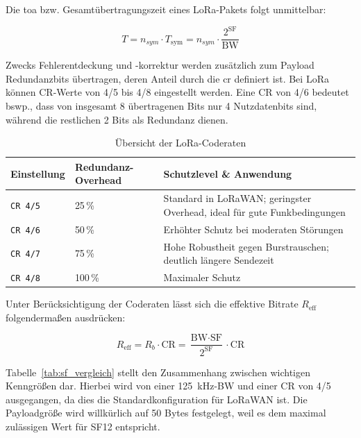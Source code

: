 Die \acrfull{toa} bzw. Gesamtübertragungszeit eines LoRa-Pakets folgt unmittelbar:

\begin{equation}
  T = n_{sym} \cdot T_\text{sym} = n_{sym} \cdot \frac{2^\text{SF}}{\text{BW}}
  \label{eq:ToA}
\end{equation}

Zwecks Fehlerentdeckung und -korrektur werden zusätzlich zum Payload Redundanzbits übertragen, deren Anteil durch die 
\acrfull{cr} definiert ist. Bei LoRa können CR-Werte von 4/5 bis 4/8 eingestellt werden. Eine CR von 4/6 bedeutet bswp., dass
von insgesamt 8 übertragenen Bits nur 4 Nutzdatenbits sind, während die restlichen 2 Bits als Redundanz dienen. 

\begin{table}[htbp]
    \centering
    \caption{Übersicht der LoRa-Coderaten}
    \label{tab:lora_CR}
    \begin{tabularx}{\textwidth}{l X X}
        \toprule
        \textbf{Einstellung} & \textbf{Redundanz-Overhead} & \textbf{Schutzlevel \& Anwendung} \\
        \midrule
        \texttt{CR 4/5} & 25\,\%  & Standard in LoRaWAN; geringster Overhead, ideal für gute Funkbedingungen \\
        \addlinespace
        \texttt{CR 4/6} & 50\,\%  & Erhöhter Schutz bei moderaten Störungen \\
        \addlinespace
        \texttt{CR 4/7} & 75\,\%  & Hohe Robustheit gegen Burstrauschen; deutlich längere Sendezeit \\
        \addlinespace
        \texttt{CR 4/8} & 100\,\% & Maximaler Schutz \\
        \bottomrule
    \end{tabularx}
\end{table}

Unter Berücksichtigung der Coderaten lässt sich die effektive Bitrate $R_\text{eff}$ folgendermaßen ausdrücken:

\begin{equation}
  R_\text{eff} = R_b \cdot \text{CR} = \frac{\text{BW} \cdot \text{SF}}{2^\text{SF}} \cdot \text{CR}
  \label{eq:rb_eff}
\end{equation}

Tabelle~\ref{tab:sf_vergleich} stellt den Zusammenhang zwischen wichtigen Kenngrößen dar. Hierbei wird von einer \qty{125}{kHz}-BW 
und einer CR von 4/5 ausgegangen, da dies die Standardkonfiguration für LoRaWAN ist. Die Payloadgröße wird willkürlich auf 50 Bytes 
festgelegt, weil es dem maximal zulässigen Wert für SF12 entspricht. 

